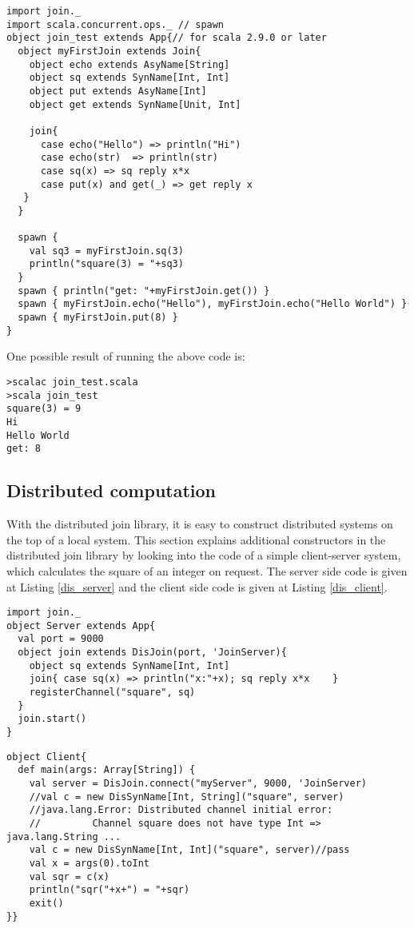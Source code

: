 \newpage

\begin{lstlisting}[label=local_join_def_example, caption=Example code for defining join patterns (join\_test.scala)]
import join._
import scala.concurrent.ops._ // spawn
object join_test extends App{// for scala 2.9.0 or later
  object myFirstJoin extends Join{
    object echo extends AsyName[String]
    object sq extends SynName[Int, Int]
    object put extends AsyName[Int]
    object get extends SynName[Unit, Int]

    join{
      case echo("Hello") => println("Hi")
      case echo(str)  => println(str)
      case sq(x) => sq reply x*x
      case put(x) and get(_) => get reply x
   }
  }

  spawn {
    val sq3 = myFirstJoin.sq(3)
    println("square(3) = "+sq3)
  }
  spawn { println("get: "+myFirstJoin.get()) }
  spawn { myFirstJoin.echo("Hello"), myFirstJoin.echo("Hello World") }
  spawn { myFirstJoin.put(8) }
}
\end{lstlisting}
One possible result of running the above code is:
\begin{lstlisting}
>scalac join_test.scala
>scala join_test
square(3) = 9
Hi
Hello World
get: 8
\end{lstlisting}



\subsection{Distributed computation}


With the distributed join library, it is easy to construct distributed systems on the top of a local system.  This section explains additional constructors in the distributed join library by looking into the code of a simple client-server system, which calculates the square of an integer on request.  The server side code is given at Listing \ref{dis_server} and the client side code is given at Listing \ref{dis_client}.

\newpage

\begin{lstlisting}[label=dis_server, caption=Server.scala]
import join._
object Server extends App{
  val port = 9000
  object join extends DisJoin(port, 'JoinServer){
    object sq extends SynName[Int, Int]
    join{ case sq(x) => println("x:"+x); sq reply x*x    }
    registerChannel("square", sq)
  }
  join.start()
}
\end{lstlisting}
\begin{lstlisting}[label=dis_client, caption=Client.scala]
object Client{
  def main(args: Array[String]) {
    val server = DisJoin.connect("myServer", 9000, 'JoinServer)
    //val c = new DisSynName[Int, String]("square", server)
    //java.lang.Error: Distributed channel initial error: 
    //         Channel square does not have type Int => java.lang.String ...
    val c = new DisSynName[Int, Int]("square", server)//pass
    val x = args(0).toInt
    val sqr = c(x)
    println("sqr("+x+") = "+sqr)
    exit()
}}
\end{lstlisting}

